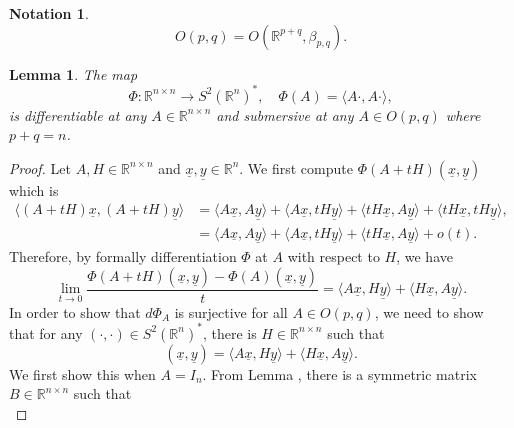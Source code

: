 \documentclass{article}
\newtheorem{lemma}{Lemma}[section]
\newtheorem{notation}{Notation}[section]
\numberwithin{equation}{section}
\begin{document}
\begin{notation}
\begin{equation*}
O(p,q) = O(\mathbb{R}^{p+q},\beta_{p,q}).
\end{equation*}
\end{notation}

\begin{lemma}
The map
\begin{equation*}
\Phi:\mathbb{R}^{n\times n}\to S^2(\mathbb{R}^{n})^*,\quad \Phi(A) = \langle A\cdot,A\cdot\rangle,
\end{equation*}
is differentiable at any $A\in\mathbb{R}^{n\times n}$ and submersive at any $A\in O(p,q)$ where $p+q=n$.
\label{symmetric_bilinear_space_lie_group}
\end{lemma}
\begin{proof}
Let $A,H\in\mathbb{R}^{n\times n}$ and $\underline{x},\underline{y}\in\mathbb{R}^n$. We first compute $\Phi(A+tH)(\underline{x},\underline{y})$ which is 
\begin{align*}
\langle(A+tH)\underline{x},(A+tH)\underline{y}\rangle & = \langle A\underline{x},A\underline{y}\rangle+\langle A\underline{x},tH\underline{y}\rangle+\langle tH\underline{x},A\underline{y}\rangle+\langle tH\underline{x},tH\underline{y}\rangle,\\
& = \langle A\underline{x},A\underline{y}\rangle+\langle A\underline{x},tH\underline{y}\rangle+\langle tH\underline{x},A\underline{y}\rangle+o(t).
\end{align*}
Therefore, by formally differentiation $\Phi$ at $A$ with respect to $H$, we have
\begin{equation*}
\lim_{t\to0}{\frac {\Phi(A+tH)(\underline{x},\underline{y})-\Phi(A)(\underline{x},\underline{y})} {t}} = \langle A\underline{x},H\underline{y}\rangle+\langle H\underline{x},A\underline{y}\rangle.
\end{equation*}
In order to show that $d\Phi_A$ is surjective for all $A\in O(p,q)$, we need to show that for any $(\cdot,\cdot)\in S^2(\mathbb{R}^n)^*$, there is $H\in\mathbb{R}^{n\times n}$ such that 
\begin{equation*}
(\underline{x},\underline{y}) = \langle A\underline{x},H\underline{y}\rangle+\langle H\underline{x},A\underline{y}\rangle.
\end{equation*}
We first show this when $A=I_n$. From Lemma %
, there is a symmetric matrix $B\in\mathbb{R}^{n\times n}$ such that 
\begin{equation*}

\end{equation*}
\end{proof}
\end{document}
